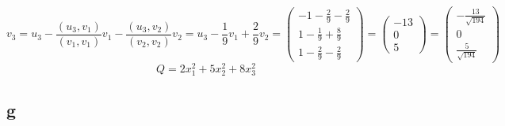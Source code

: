 $$ v_3 = u_3 - \frac{(u_3, v_1)}{(v_1, v_1)}v_1 - \frac{(u_3, v_2)}{(v_2, v_2)}v_2 = u_3 - \frac19v_1 + \frac29v_2 =
\begin{pmatrix}
	-1 - \frac29 - \frac29 \\
    1 - \frac19 + \frac89 \\
    1 - \frac29 - \frac29
\end{pmatrix} =
\begin{pmatrix}
	-13 \\
    0 \\
    5
\end{pmatrix} =
\begin{pmatrix}
    -\frac{13}{\sqrt{194}} \\
    0 \\
    \frac5{\sqrt{194}}
\end{pmatrix} $$
$$ Q = 2x_1^2 + 5x_2^2 + 8x_3^2 $$

\subsection{g}

